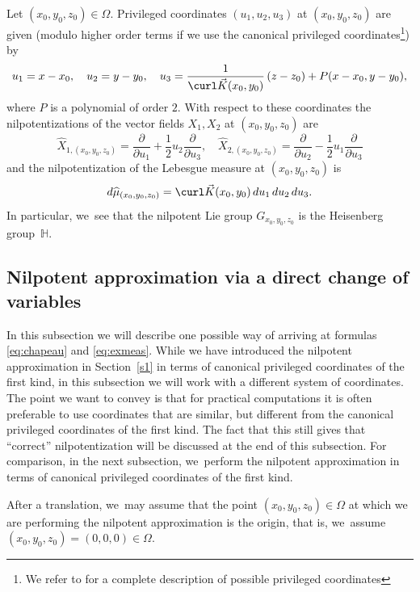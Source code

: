 Let $(x_0,y_0,z_0)\in\Omega$. Privileged coordinates $(u_1,u_2,u_3)$ at $(x_0,y_0,z_0)$ are given (modulo higher order terms if we use the canonical privileged coordinates\footnote{We refer to \cite{ChoPo1,ChoPo2} for a complete description of possible privileged coordinates}) by
\begin{equation} \label{eq:cdv}
u_1= x-x_0,\quad u_2 = y-y_0,\quad u_3 = \frac{1}{\curl \vec{K} (x_0,y_0)} \,(z-z_0) + P (x-x_0,y-y_0),
\end{equation}
where $P$ is a polynomial of order $2$. With respect to these coordinates the nilpotentizations of the vector fields $X_1,X_2$ at $(x_0,y_0,z_0)$ are
\begin{equation}\label{eq:chapeau}
\widehat X_{1,(x_0,y_0,z_0)} = \frac{\partial}{\partial u_1} + \frac 12 u_2 \frac{\partial}{\partial u_3},\quad
\widehat X_{2,(x_0,y_0,z_0)} = \frac{\partial}{\partial u_2} - \frac 12 u_1 \frac{\partial}{\partial u_3}
\end{equation}
and the nilpotentization of the Lebesgue measure at $(x_0,y_0,z_0)$ is
\begin{equation}\label{eq:exmeas}
d\widehat\mu_{(x_0,y_0,z_0)} = \curl \vec{K} (x_0,y_0)\,du_1 \,du_2 \,du_3.
\end{equation}
In particular, we~see that the nilpotent Lie group $G_{x_0,y_0,z_0}$ is the Heisenberg group~$\mathbb H$.

\subsection{Nilpotent approximation via a direct change of variables}
In this subsection we will describe one possible way of arriving at formulas \eqref{eq:chapeau} and \eqref{eq:exmeas}. While we have introduced the nilpotent approximation in Section~\ref{s1} in terms of canonical privileged coordinates of the first kind, in this subsection we will work with a different system of coordinates. The point we want to convey is that for practical computations it is often preferable to use coordinates that are similar, but different from the canonical privileged coordinates of the first kind. The fact that this still gives that ``correct'' nilpotentization will be discussed at the end of this subsection. For comparison, in the next subsection, we~perform the nilpotent approximation in terms of canonical privileged coordinates of the first kind.

After a translation, we~may assume that the point $(x_0,y_0,z_0)\in\Omega$ at which we are performing the nilpotent approximation is the origin, that is, we~assume $(x_0,y_0,z_0)= (0,0,0) \in \Omega$.

